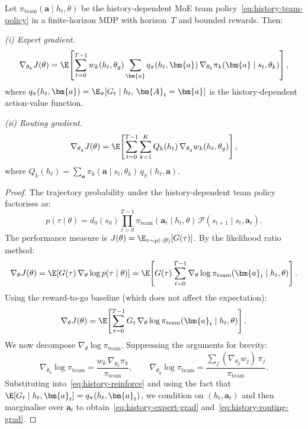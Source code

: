 \begin{theorem}\label{thm:history-team-pgt}
Let $\pi_{\mathrm{team}}(\bm{a}\mid h_t,\theta)$ be the history-dependent MoE team policy~\eqref{eq:history-team-policy} in a finite-horizon MDP with horizon~$T$ and bounded rewards. Then:

\medskip\noindent\emph{(i) Expert gradient.}
\begin{equation}\label{eq:history-expert-grad}
  \nabla_{\theta_k}J(\theta) = \E\!\left[\sum_{t=0}^{T-1} w_k(h_t,\theta_g)\sum_{\bm{a}} q_\pi(h_t,\bm{a})\,\nabla_{\theta_k}\pi_k(\bm{a}\mid s_t,\theta_k)\right],
\end{equation}
where $q_\pi(h_t,\bm{a}) = \E_\pi[G_t\mid h_t,\,\bm{A}_t=\bm{a}]$ is the history-dependent action-value function.

\medskip\noindent\emph{(ii) Routing gradient.}
\begin{equation}\label{eq:history-routing-grad}
  \nabla_{\theta_g}J(\theta) = \E\!\left[\sum_{t=0}^{T-1}\sum_{k=1}^K Q_k(h_t)\,\nabla_{\theta_g}w_k(h_t,\theta_g)\right],
\end{equation}
where $Q_k(h_t) = \sum_{\bm{a}}\pi_k(\bm{a}\mid s_t,\theta_k)\,q_\pi(h_t,\bm{a})$.
\end{theorem}

\begin{proof}
The trajectory probability under the history-dependent team policy factorises as:
\[
  p(\tau\mid\theta) = d_0(s_0)\prod_{t=0}^{T-1}\pi_{\mathrm{team}}(\bm{a}_t\mid h_t,\theta)\,\mathcal{P}(s_{t+1}\mid s_t,\bm{a}_t).
\]
The performance measure is $J(\theta)=\E_{\tau\sim p(\cdot\mid\theta)}[G(\tau)]$. By the likelihood ratio method:
\[
  \nabla_\theta J(\theta) = \E\!\left[G(\tau)\,\nabla_\theta\log p(\tau\mid\theta)\right]
  = \E\!\left[G(\tau)\sum_{t=0}^{T-1}\nabla_\theta\log\pi_{\mathrm{team}}(\bm{a}_t\mid h_t,\theta)\right].
\]
Using the reward-to-go baseline (which does not affect the expectation):
\begin{equation}\label{eq:history-reinforce}
  \nabla_\theta J(\theta) = \E\!\left[\sum_{t=0}^{T-1} G_t\,\nabla_\theta\log\pi_{\mathrm{team}}(\bm{a}_t\mid h_t,\theta)\right].
\end{equation}
We now decompose $\nabla_\theta\log\pi_{\mathrm{team}}$. Suppressing the arguments for brevity:
\[
  \nabla_{\theta_k}\log\pi_{\mathrm{team}} = \frac{w_k\,\nabla_{\theta_k}\pi_k}{\pi_{\mathrm{team}}}, \qquad
  \nabla_{\theta_g}\log\pi_{\mathrm{team}} = \frac{\sum_j(\nabla_{\theta_g}w_j)\,\pi_j}{\pi_{\mathrm{team}}}.
\]
Substituting into~\eqref{eq:history-reinforce} and using the fact that $\E[G_t\mid h_t,\bm{a}_t]=q_\pi(h_t,\bm{a}_t)$, we condition on $(h_t,\bm{a}_t)$ and then marginalise over $\bm{a}_t$ to obtain~\eqref{eq:history-expert-grad} and~\eqref{eq:history-routing-grad}.
\end{proof}

